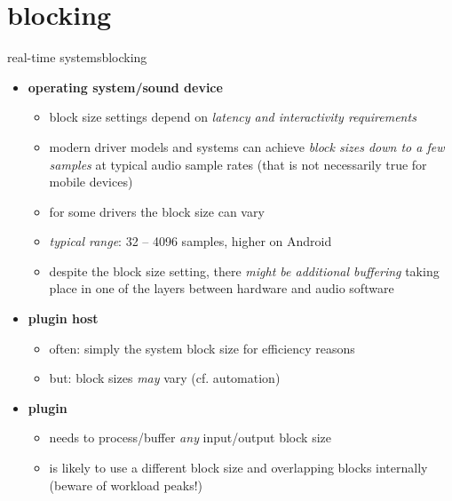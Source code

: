     
    \section{blocking}
   \begin{frame}{real-time systems}{blocking}
        \vspace{-3mm}
        \begin{itemize}
            \item \textbf{operating system/sound device}
                \begin{itemize}
                    \item   block size settings depend on \textit{latency and interactivity requirements}
                    \item   modern driver models and systems can achieve \textit{block sizes down to a few samples} at typical audio sample rates (that is not necessarily true for mobile devices)
                    \item   for some drivers the block size can vary
                    \item   \textit{typical range}: 32 -- 4096 samples, higher on Android
                    \item   despite the block size setting, there \textit{might be additional buffering} taking place in one of the layers between hardware and audio software
                \end{itemize}
            \smallskip
            \item<2->   \textbf{plugin host}
                \begin{itemize}
                    \item   often: simply the system block size for efficiency reasons
                    \item   but: block sizes \textit{may} vary (cf. automation)
                \end{itemize}
            \smallskip
            \item<3->   \textbf{plugin}
                \begin{itemize}
                    \item   needs to process/buffer \textit{any} input/output block size
                    \item   is likely to use a different block size and overlapping blocks internally (beware of workload peaks!)
                \end{itemize}
        \end{itemize}
    \end{frame}

